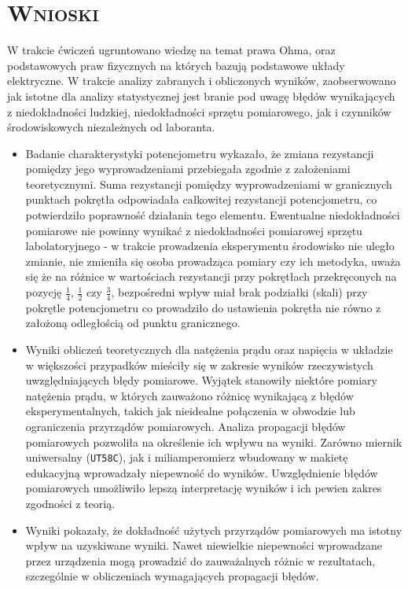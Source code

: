 \documentclass[,a4paper,12pt]{article}
\begin{document}
\section{\textsc{Wnioski}}
W trakcie ćwiczeń ugruntowano wiedzę na temat prawa Ohma, oraz podstawowych praw fizycznych na których bazują podstawowe układy elektryczne. W trakcie analizy zabranych i obliczonych wyników, zaobserwowano jak istotne dla analizy statystycznej jest branie pod uwagę błędów wynikających z niedokładności ludzkiej, niedokładności sprzętu pomiarowego, jak i czynników środowiskowych niezależnych od laboranta.
\begin{itemize}
    \item Badanie charakterystyki potencjometru wykazało, że zmiana rezystancji pomiędzy jego wyprowadzeniami przebiegała zgodnie z założeniami teoretycznymi. Suma rezystancji pomiędzy wyprowadzeniami w granicznych punktach pokrętła odpowiadała całkowitej rezystancji potencjometru, co potwierdziło poprawność działania tego elementu. Ewentualne niedokładności pomiarowe nie powinny wynikać z niedokładności pomiarowej sprzętu labolatoryjnego - w trakcie prowadzenia eksperymentu środowisko nie uległo zmianie, nie zmieniła się osoba prowadząca pomiary czy ich metodyka, uważa się że na różnice w wartościach rezystancji przy pokrętłach przekręconych na pozycję $\frac{1}{4}$,  $\frac{1}{2}$ czy $\frac{3}{4}$, bezpośredni wpływ miał brak podziałki (skali) przy pokrętle potencjometru co prowadziło do ustawienia pokrętła nie równo z założoną odległością od punktu granicznego.
    \item Wyniki obliczeń teoretycznych dla natężenia prądu oraz napięcia w układzie w większości przypadków mieściły się w zakresie wyników rzeczywistych uwzględniających błędy pomiarowe. Wyjątek stanowiły niektóre pomiary natężenia prądu, w których zauważono różnicę wynikającą z błędów eksperymentalnych, takich jak nieidealne połączenia w obwodzie lub ograniczenia przyrządów pomiarowych. Analiza propagacji błędów pomiarowych pozwoliła na określenie ich wpływu na wyniki. Zarówno miernik uniwersalny (\texttt{UT58C}), jak i miliamperomierz wbudowany w makietę edukacyjną wprowadzały niepewność do wyników. Uwzględnienie błędów pomiarowych umożliwiło lepszą interpretację wyników i ich pewien zakres zgodności z teorią.
    \item Wyniki pokazały, że dokładność użytych przyrządów pomiarowych ma istotny wpływ na uzyskiwane wyniki. Nawet niewielkie niepewności wprowadzane przez urządzenia mogą prowadzić do zauważalnych różnic w rezultatach, szczególnie w obliczeniach wymagających propagacji błędów.
\end{itemize}
\end{document}

